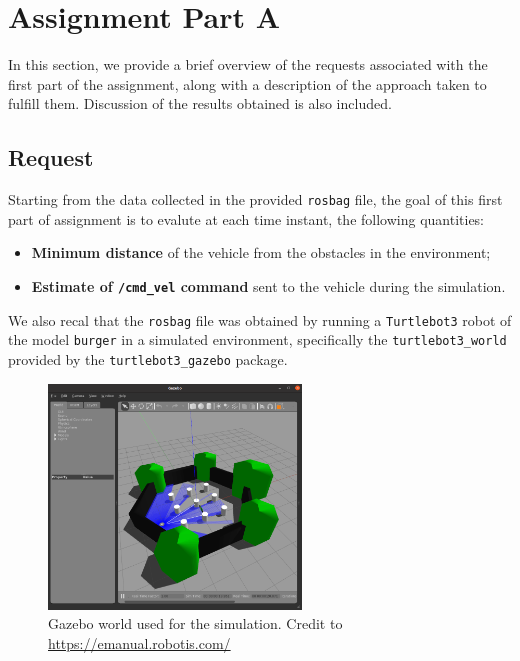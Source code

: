 \section{Assignment Part A}
\label{sec:assignment_part_A}

In this section, we provide a brief overview of the requests associated with the first part of the assignment, along with a description of the approach taken to fulfill them.
Discussion of the results obtained is also included.



\subsection{Request}
\label{subsec:request_part_A}

Starting from the data collected in the provided \texttt{rosbag} file, the goal of this first part of assignment is to evalute at each time instant, the following quantities:

\begin{itemize}
    \item \textbf{Minimum distance} of the vehicle from the obstacles in the environment;
    \item \textbf{Estimate of \texttt{/cmd\_vel} command} sent to the vehicle during the simulation.
\end{itemize}

We also recal that the \texttt{rosbag} file was obtained by running a \texttt{Turtlebot3} robot of the model \texttt{burger} in a simulated environment, specifically the \texttt{turtlebot3\_world} provided by the \texttt{turtlebot3\_gazebo} package.

\begin{figure}[H]
    \centering
    \includegraphics[width=0.6\textwidth]{./img/gazebo_world.png}
    \caption{Gazebo world used for the simulation. Credit to \url{https://emanual.robotis.com/}}
    \label{fig:turtlebot3_world}
\end{figure}



